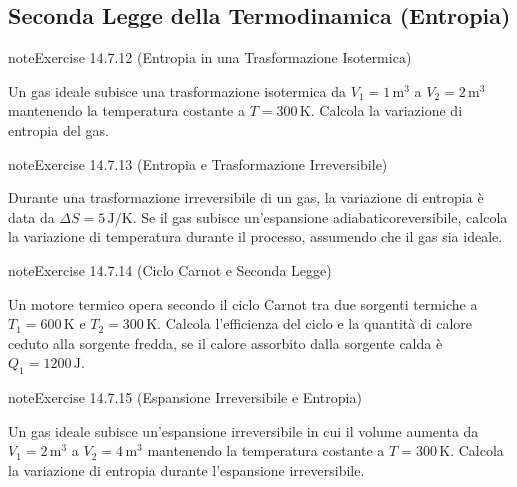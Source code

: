 \documentclass[letterpaper,10pt,italian]{jupyterBook}
\begin{document}
\subsection{Seconda Legge della Termodinamica (Entropia)}
\label{\detokenize{ch/thermodynamics/principles-problems:seconda-legge-della-termodinamica-entropia}} \label{exercise:ch/thermodynamics/principles-problems-exercise-11}

\begin{sphinxadmonition}{note}{Exercise 14.7.12 (Entropia in una Trasformazione Isotermica)}



\sphinxAtStartPar
Un gas ideale subisce una trasformazione isotermica da \(V_1 = 1 \, \text{m}^3\) a \(V_2 = 2 \, \text{m}^3\) mantenendo la temperatura costante a \(T = 300 \, \text{K}\). Calcola la variazione di entropia del gas.
\end{sphinxadmonition}
 \label{exercise:ch/thermodynamics/principles-problems-exercise-12}

\begin{sphinxadmonition}{note}{Exercise 14.7.13 (Entropia e Trasformazione Irreversibile)}



\sphinxAtStartPar
Durante una trasformazione irreversibile di un gas, la variazione di entropia è data da \(\Delta S = 5 \, \text{J/K}\). Se il gas subisce un’espansione adiabatico\sphinxhyphen{}reversibile, calcola la variazione di temperatura durante il processo, assumendo che il gas sia ideale.
\end{sphinxadmonition}
 \label{exercise:ch/thermodynamics/principles-problems-exercise-13}

\begin{sphinxadmonition}{note}{Exercise 14.7.14 (Ciclo Carnot e Seconda Legge)}



\sphinxAtStartPar
Un motore termico opera secondo il ciclo Carnot tra due sorgenti termiche a \(T_1 = 600 \, \text{K}\) e \(T_2 = 300 \, \text{K}\). Calcola l’efficienza del ciclo e la quantità di calore ceduto alla sorgente fredda, se il calore assorbito dalla sorgente calda è \(Q_1 = 1200 \, \text{J}\).
\end{sphinxadmonition}
 \label{exercise:ch/thermodynamics/principles-problems-exercise-14}

\begin{sphinxadmonition}{note}{Exercise 14.7.15 (Espansione Irreversibile e Entropia)}



\sphinxAtStartPar
Un gas ideale subisce un’espansione irreversibile in cui il volume aumenta da \(V_1 = 2 \, \text{m}^3\) a \(V_2 = 4 \, \text{m}^3\) mantenendo la temperatura costante a \(T = 300 \, \text{K}\). Calcola la variazione di entropia durante l’espansione irreversibile.
\end{sphinxadmonition}
 \label{exercise:ch/thermodynamics/principles-problems-exercise-15}
\end{document}
